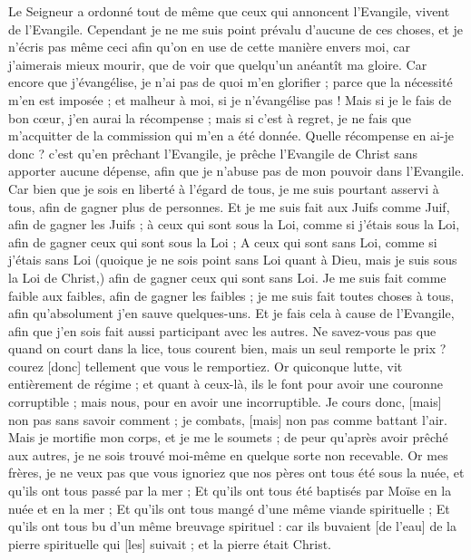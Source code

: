 \begin{multicols}{2}
Le Seigneur a ordonné tout de même que ceux qui annoncent l'Evangile, vivent de l'Evangile.
Cependant je ne me suis point prévalu d'aucune de ces choses, et je n'écris pas même ceci afin qu'on en use de cette manière envers moi, car j’aimerais mieux mourir, que de voir que quelqu'un anéantît ma gloire.
Car encore que j'évangélise, je n'ai pas de quoi m'en glorifier ; parce que la nécessité m'en est imposée ; et malheur à moi, si je n'évangélise pas !
Mais si je le fais de bon cœur, j’en aurai la récompense ; mais si c'est à regret, je ne fais que m'acquitter de la commission qui m’en a été donnée.
Quelle récompense en ai-je donc ? c'est qu'en prêchant l'Evangile, je prêche l'Evangile de Christ sans apporter aucune dépense, afin que je n'abuse pas de mon pouvoir dans l’Evangile.
Car bien que je sois en liberté à l'égard de tous, je me suis pourtant asservi à tous, afin de gagner plus de personnes.
Et je me suis fait aux Juifs comme Juif, afin de gagner les Juifs ; à ceux qui sont sous la Loi, comme si j'étais sous la Loi, afin de gagner ceux qui sont sous la Loi ;
A ceux qui sont sans Loi, comme si j'étais sans Loi (quoique je ne sois point sans Loi quant à Dieu, mais je suis sous la Loi de Christ,) afin de gagner ceux qui sont sans Loi.
Je me suis fait comme faible aux faibles, afin de gagner les faibles ; je me suis fait toutes choses à tous, afin qu'absolument j'en sauve quelques-uns.
Et je fais cela à cause de l'Evangile, afin que j'en sois fait aussi participant avec les autres.
Ne savez-vous pas que quand on court dans la lice, tous courent bien, mais un seul remporte le prix ? courez [donc] tellement que vous le remportiez.
Or quiconque lutte, vit entièrement de régime ; et quant à ceux-là, ils le font pour avoir une couronne corruptible ; mais nous, pour en avoir une incorruptible.
Je cours donc, [mais] non pas sans savoir comment ; je combats, [mais] non pas comme battant l'air.
Mais je mortifie mon corps, et je me le soumets ; de peur qu'après avoir prêché aux autres, je ne sois trouvé moi-même en quelque sorte non recevable.
\VerseOne{}Or mes frères, je ne veux pas que vous ignoriez que nos pères ont tous été sous la nuée, et qu'ils ont tous passé par la mer ;
Et qu'ils ont tous été baptisés par Moïse en la nuée et en la mer ;
Et qu'ils ont tous mangé d'une même viande spirituelle ;
Et qu'ils ont tous bu d'un même breuvage spirituel : car ils buvaient [de l'eau] de la pierre spirituelle qui [les] suivait ; et la pierre était Christ.

\end{multicols}
